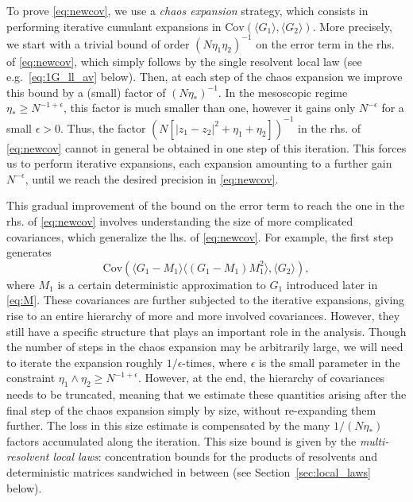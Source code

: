 \documentclass[10pt]{amsart}
\numberwithin{equation}{section}
\begin{document}
To prove \eqref{eq:newcov}, we use a \emph{chaos expansion} strategy, which consists in performing iterative cumulant expansions in $\mathrm{Cov}(\langle G_1\rangle,\langle G_2\rangle)$. More precisely, we start with a trivial bound of order $(N\eta_1\eta_2)^{-1}$ on the error term in the rhs. of \eqref{eq:newcov}, which simply follows by the single resolvent local law (see e.g.~\eqref{eq:1G_ll_av} below). Then, at each step of the chaos expansion we improve this bound by a (small) factor of $(N\eta_*)^{-1}$. In the mesoscopic regime $\eta_*\ge N^{-1+\epsilon}$, this factor is much smaller than one, however it gains only $N^{-\epsilon}$ for a small $\epsilon>0$. Thus, the factor $(N[|z_1-z_2|^2+\eta_1+\eta_2])^{-1}$ in the rhs. of \eqref{eq:newcov} cannot in general be obtained in one step of this iteration. This forces us to perform iterative expansions, each expansion amounting to a further gain $ N^{-\epsilon}$, until we reach the desired precision in \eqref{eq:newcov}.

This gradual improvement of the bound on the error term to reach the one in the rhs. of \eqref{eq:newcov} involves understanding the size of more complicated covariances, which generalize the lhs. of \eqref{eq:newcov}. For example, the first step generates 
\begin{equation}
\mathrm{Cov}\left(\langle G_1-M_1\rangle\langle (G_1-M_1)M_1^2\rangle,\langle G_2\rangle\right),
\label{eq:Cov_intro}
\end{equation}
where $M_1$ is a certain deterministic approximation to $G_1$ introduced later in \eqref{eq:M}. These covariances are further subjected to the iterative expansions, giving rise to an entire hierarchy of more and more involved covariances. However, they still have a specific structure that plays an important role in the analysis. Though the number of steps in the chaos expansion may be arbitrarily large, we will need to iterate the expansion roughly $1/\epsilon$-times, where $\epsilon$ is the small parameter in the constraint $\eta_1\wedge\eta_2\ge N^{-1+\epsilon}$. However, at the end, the hierarchy of covariances needs to be truncated, meaning that we estimate these quantities arising after the final step of the chaos expansion simply by size, without re-expanding them further. The loss in this size estimate is compensated by the many $1/(N\eta_*)$ factors accumulated along the iteration. This size bound is given by the \emph{multi-resolvent local laws}: concentration bounds for the products of resolvents and deterministic matrices sandwiched in between (see Section~\ref{sec:local_laws} below).
\end{document}
